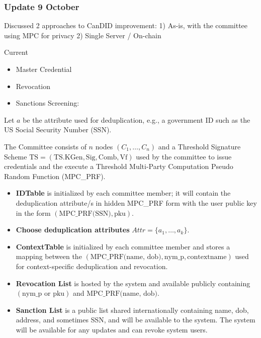 \subsubsection{Update 9 October}
Discussed 2 approaches to CanDID improvement:
1) As-is, with the committee using MPC for privacy
2) Single Server / On-chain

Current 
\begin{itemize}
    \item Master Credential
\end{itemize}
\begin{itemize}
    \item Revocation
    \item Sanctions Screening: 
\end{itemize}


Let \( a \) be the attribute used for deduplication, e.g., a government ID such as the US Social Security Number (SSN).

The Committee consists of \( n \) nodes \( (C_1, \ldots, C_n) \) and a Threshold Signature Scheme \( \text{TS} = (\text{TS.KGen}, \text{Sig}, \text{Comb}, \text{Vf}) \) used by the committee to issue credentials and the execute a Threshold Multi-Party Computation Pseudo Random Function (MPC\_PRF).

\begin{itemize}
    
    \item \textbf{IDTable} is initialized by each committee member; it will contain the deduplication attribute/s in hidden MPC\_PRF form with the user public key in the form \( (\text{MPC\_PRF(SSN)}, \text{pku}) \).
    
    \item \textbf{Choose deduplication attributes} $Attr = \{a_1, \ldots, a_k\}$. \
    
    \item \textbf{ContextTable} is initialized by each committee member and stores a mapping between the \( (\text{MPC\_PRF(name, dob)}, \text{nym\_p}, \text{contextname}) \) used for context-specific deduplication and revocation.
    
    \item \textbf{Revocation List} is hosted by the system and available publicly containing \( (\text{nym\_p} \text{ or } \text{pku}) \) and \( \text{MPC\_PRF(name, dob)} \).
    
    \item \textbf{Sanction List} is a public list shared internationally containing name, dob, address, and sometimes SSN, and will be available to the system. The system will be available for any updates and can revoke system users.
    
\end{itemize}


